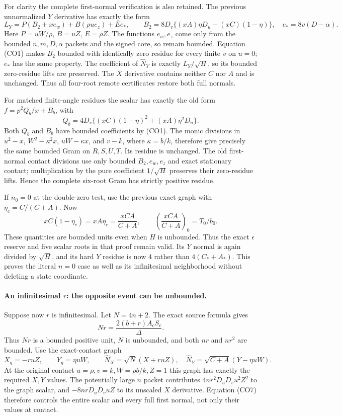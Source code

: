 For clarity the complete first-normal verification is also retained.
The previous unnormalized $Y$ derivative has exactly the form
\[
 L_Y=P(B_2+xe_w)+B(\rho u e_z)+E e_*,\qquad
 B_2=8D_v\{(xA)\eta D_u-(xC)(1-\eta)\},
 \quad e_*=8v(D-\alpha).                                \tag{CO5}
\]
Here $P=uW/\rho$, $B=uZ$, $E=\rho Z$.  The functions $e_w,e_z$
come only from the bounded $n,m,D,\alpha$ packets and the signed
core, so remain bounded.  Equation (CO1) makes $B_2$ bounded with
identically zero residue for every finite $v$ on $u=0$; $e_*$ has
the same property.  The coefficient of $\widehat N_Y$ is exactly
$L_Y/\sqrt H$, so its bounded zero-residue lifts are preserved.
The $X$ derivative contains neither $C$ nor $A$ and is unchanged.
Thus all four-root remote certificates restore both full normals.

For matched finite-angle residues the scalar has exactly the old
form $f=p^2Q_b/x+B_b$, with
\[
 Q_b=4D_v\{(xC)(1-\eta)^2+(xA)\eta^2D_u\}.
\]
Both $Q_b$ and $B_b$ have bounded coefficients by (CO1).  The monic
divisions in $u^2-x$, $W^2-\kappa^2x$, $uW-\kappa x$, and $v-k$,
where $\kappa=b/k$, therefore give precisely the same bounded Gram
on $R,S,U,T$.  Its residue is unchanged.  The old first-normal
contact divisions use only bounded $B_2,e_w,e_z$ and exact stationary
contact; multiplication by the pure coefficient $1/\sqrt H$
preserves their zero-residue lifts.  Hence the complete six-root
Gram has strictly positive residue.

If $n_0=0$ at the double-zero test, use the previous exact graph
with $\eta_c=C/(C+A)$.  Now
\[
 xC(1-\eta_c)=xA\eta_c=\frac{xCA}{C+A},
 \qquad
 \left(\frac{xCA}{C+A}\right)_0=T_0/b_0.                \tag{CO6}
\]
These quantities are bounded units even when $H$ is unbounded.
Thus the exact $\epsilon$ reserve and five scalar roots in that
proof remain valid.  Its $Y$ normal is again divided by $\sqrt H$,
and its hard $Y$ residue is now $4$ rather than $4(C_*+A_*)$.
This proves the literal $n=0$ case as well as its infinitesimal
neighborhood without deleting a state coordinate.

\paragraph{An infinitesimal $r$: the opposite event can be unbounded.}
Suppose now $r$ is infinitesimal.  Let $N=4n+2$.  The exact source
formula gives
\[
             Nr=\frac{2(b+r)A_cS_c}{\Delta}.             \tag{CO7}
\]
Thus $Nr$ is a bounded positive unit, $N$ is unbounded, and both
$nr$ and $nr^2$ are bounded.  Use the exact-contact graph
\[
 X_g=-ruZ,\qquad Y_g=\eta uW,
 \qquad
 \widehat N_X=\sqrt N(X+ruZ),\quad
 \widehat N_Y=\sqrt{C+A}(Y-\eta uW).                    \tag{CO8}
\]
At the original contact $u=\rho,v=k,W=\rho b/k,Z=1$ this graph
has exactly the required $X,Y$ values.  The potentially large $n$
packet contributes $4nr^2D_uD_vu^2Z^2$ to the graph scalar, and
$-8nrD_uD_vuZ$ to its unscaled $X$ derivative.  Equation (CO7)
therefore controls the entire scalar and every full first normal,
not only their values at contact.

